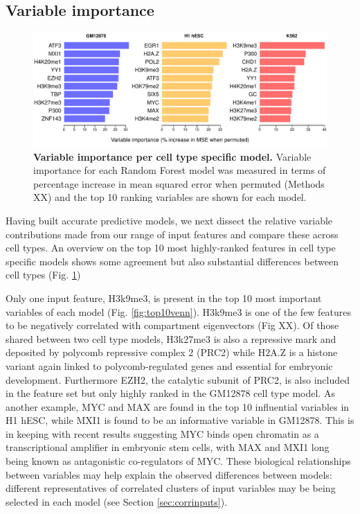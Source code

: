 \documentclass[a4paper,11pt,oneside]{book}
\begin{document}
\subsection{Variable importance}

\begin{figure}
\begin{center} 
\includegraphics[width=\textwidth]{figs/varimp.pdf}
\captionsetup{width=\textwidth} 
\caption{ {\bf Variable importance per cell type specific model. }
Variable importance for each Random Forest model was measured in terms of percentage increase in mean squared error when permuted (Methods XX) and the top 10 ranking variables are shown for each model.
}\label{fig:varimp}
\end{center} 
\end{figure} 

Having built accurate predictive models, we next dissect the relative variable contributions made from our range of input features and compare these across cell types. An overview on the top 10 most highly-ranked features in cell type specific models shows some agreement but also substantial differences between cell types (Fig. \ref{fig:varimp})

Only one input feature, H3k9me3, is present in the top 10 most important variables of each model (Fig. \ref{fig:top10venn}). H3k9me3 is one of the few features to be negatively correlated with compartment eigenvectors (Fig XX). Of those shared between two cell type models, H3k27me3 is also a repressive mark and deposited by polycomb repressive complex 2 (PRC2)\cite{Vizan2014} while H2A.Z is a histone variant again linked to polycomb-regulated genes and essential for embryonic development.\cite{Creyghton2008} Furthermore EZH2, the catalytic subunit of PRC2,\cite{Deb2014} is also included in the feature set but only highly ranked in the GM12878 cell type model. As another example, MYC and MAX are found in the top 10 influential variables in H1 hESC, while MXI1 is found to be an informative variable in GM12878. This is in keeping with recent results suggesting MYC
binds open chromatin as a transcriptional amplifier in embryonic stem
cells,\cite{Nie2012, Kieffer-Kwon2013a} with MAX and MXI1 long being
known as antagonistic co-regulators of MYC.\cite{Zervos1993} These biological relationships between variables may help explain the observed differences between models: different representatives of correlated clusters of input variables may be being selected in each model (see Section \ref{sec:corrinputs}).
\end{document}
